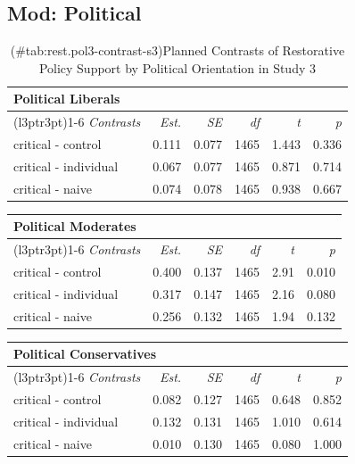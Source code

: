 \documentclass[
]{book}
\begin{document}
\hypertarget{mod-political-8}{%
\subsection{Mod: Political}\label{mod-political-8}}

\begin{table}

\caption{(\#tab:rest.pol3-contrast-s3)Planned Contrasts of Restorative Policy Support by Political Orientation in Study 3}
\centering
\begin{tabular}[t]{lrrrrr}
\toprule
\multicolumn{6}{l}{Political Liberals} \\
\cmidrule(l{3pt}r{3pt}){1-6}
\em{Contrasts} & \em{Est.} & \em{SE} & \em{df} & \em{t} & \em{p}\\
\midrule
critical - control & 0.111 & 0.077 & 1465 & 1.443 & 0.336\\
critical - individual & 0.067 & 0.077 & 1465 & 0.871 & 0.714\\
critical - naive & 0.074 & 0.078 & 1465 & 0.938 & 0.667\\
\bottomrule
\end{tabular}
\end{table}

\begin{table}
\centering
\fontsize{13}{15}\selectfont
\begin{tabular}{lrrrrr}
\toprule
\multicolumn{6}{l}{Political Moderates} \\
\cmidrule(l{3pt}r{3pt}){1-6}
\em{Contrasts} & \em{Est.} & \em{SE} & \em{df} & \em{t} & \em{p}\\
\midrule
critical - control & 0.400 & 0.137 & 1465 & 2.91 & 0.010\\
critical - individual & 0.317 & 0.147 & 1465 & 2.16 & 0.080\\
critical - naive & 0.256 & 0.132 & 1465 & 1.94 & 0.132\\
\bottomrule
\end{tabular}
\end{table}

\begin{table}
\centering
\fontsize{13}{15}\selectfont
\begin{tabular}{lrrrrr}
\toprule
\multicolumn{6}{l}{Political Conservatives} \\
\cmidrule(l{3pt}r{3pt}){1-6}
\em{Contrasts} & \em{Est.} & \em{SE} & \em{df} & \em{t} & \em{p}\\
\midrule
critical - control & 0.082 & 0.127 & 1465 & 0.648 & 0.852\\
critical - individual & 0.132 & 0.131 & 1465 & 1.010 & 0.614\\
critical - naive & 0.010 & 0.130 & 1465 & 0.080 & 1.000\\
\bottomrule
\end{tabular}
\end{table}
\end{document}
